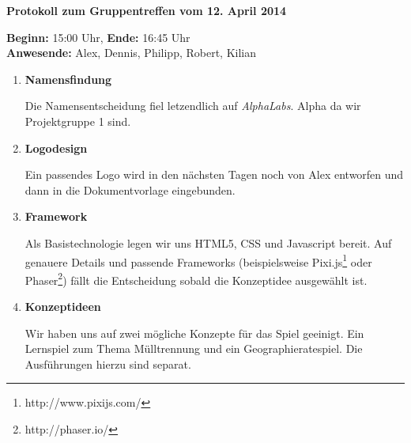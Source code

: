\documentclass[a4paper]{article}
\newcommand{\changefont}[3]{
\fontfamily{#1} \fontseries{#2} \fontshape{#3} \selectfont}
\newcommand{\TOP}[1]{\item \textbf{#1}\par}
\begin{document}
\changefont{cmss}{m}{n} %

\begin{center}
\textbf{\Large Protokoll zum Gruppentreffen vom 12. April 2014}
\end{center}

\textbf{Beginn:} 15:00 Uhr, \textbf{Ende:} 16:45 Uhr\\
\textbf{Anwesende:} Alex, Dennis, Philipp, Robert, Kilian

\vspace{5mm}

\begin{enumerate}

\TOP{Namensfindung}
Die Namensentscheidung fiel letzendlich auf \textit{AlphaLabs}. Alpha da wir Projektgruppe 1 sind.

\TOP{Logodesign}
Ein passendes Logo wird in den nächsten Tagen noch von Alex entworfen und dann in die Dokumentvorlage eingebunden.

\TOP{Framework}
Als Basistechnologie legen wir uns HTML5, CSS und Javascript bereit. Auf genauere Details und passende Frameworks (beispielsweise Pixi.js\footnote{http://www.pixijs.com/} oder Phaser\footnote{http://phaser.io/}) fällt die Entscheidung sobald die Konzeptidee ausgewählt ist.

\TOP{Konzeptideen}
Wir haben uns auf zwei mögliche Konzepte für das Spiel geeinigt. Ein Lernspiel zum Thema Mülltrennung und ein Geographieratespiel. Die Ausführungen hierzu sind separat.

\end{enumerate}
\end{document}
